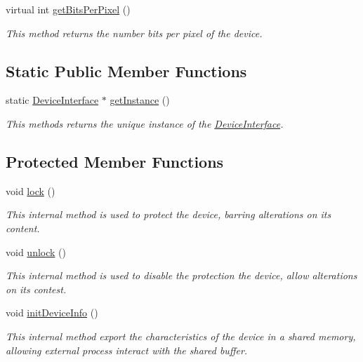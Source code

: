 \begin{DoxyCompactItemize}
virtual int \hyperlink{classbr_1_1ufscar_1_1lince_1_1streaming_1_1DeviceInterface_ae792aa4c26dfc014c9de2939af442339}{getBitsPerPixel} ()
\begin{DoxyCompactList}\small\item\em This method returns the number bits per pixel of the device. \item\end{DoxyCompactList}\end{DoxyCompactItemize}
\subsection*{Static Public Member Functions}
\begin{DoxyCompactItemize}
\item 
static \hyperlink{classbr_1_1ufscar_1_1lince_1_1streaming_1_1DeviceInterface}{DeviceInterface} $\ast$ \hyperlink{classbr_1_1ufscar_1_1lince_1_1streaming_1_1DeviceInterface_a71372a3264033df2716d0300f54d4618}{getInstance} ()
\begin{DoxyCompactList}\small\item\em This methods returns the unique instance of the \hyperlink{classbr_1_1ufscar_1_1lince_1_1streaming_1_1DeviceInterface}{DeviceInterface}. \item\end{DoxyCompactList}\end{DoxyCompactItemize}
\subsection*{Protected Member Functions}
\begin{DoxyCompactItemize}
\item 
void \hyperlink{classbr_1_1ufscar_1_1lince_1_1streaming_1_1DeviceInterface_a409c99b4d2a758d775bde989ca9e97be}{lock} ()
\begin{DoxyCompactList}\small\item\em This internal method is used to protect the device, barring alterations on its content. \item\end{DoxyCompactList}\item 
void \hyperlink{classbr_1_1ufscar_1_1lince_1_1streaming_1_1DeviceInterface_aab816345220d1eed3838635dfebb40d6}{unlock} ()
\begin{DoxyCompactList}\small\item\em This internal method is used to disable the protection the device, allow alterations on its contest. \item\end{DoxyCompactList}\item 
void \hyperlink{classbr_1_1ufscar_1_1lince_1_1streaming_1_1DeviceInterface_ae83c57ed7c71e480f596e21a64a6559f}{initDeviceInfo} ()
\begin{DoxyCompactList}\small\item\em This internal method export the characteristics of the device in a shared memory, allowing external process interact with the shared buffer. \item\end{DoxyCompactList}\end{DoxyCompactItemize}


